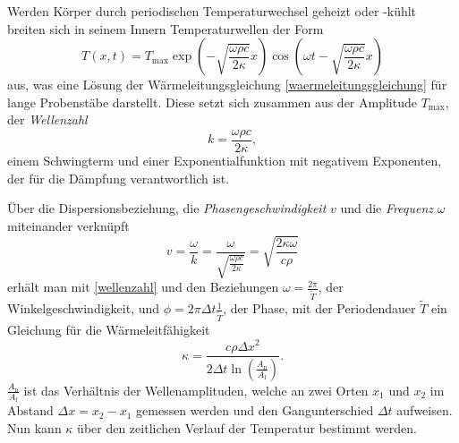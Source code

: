 Werden Körper durch periodischen Temperaturwechsel geheizt oder -kühlt breiten sich in seinem Innern Temperaturwellen der Form
\begin{equation}
	\label{temperaturwelle}
	T(x,t)= T_\mathup{max} \exp{\left(-\sqrt{\frac{\omega \rho c}{2\kappa}}x\right)} \cos{\left(\omega t - \sqrt{\frac{\omega \rho c}{2\kappa}}x\right)}
\end{equation}
aus, was eine Lösung der Wärmeleitungsgleichung \eqref{waermeleitungsgleichung} für lange Probenstäbe darstellt. Diese setzt sich zusammen aus der Amplitude $T_\text{max}$, der \emph{Wellenzahl} 
\begin{equation}
	\label{wellenzahl}
	k=\frac{\omega \rho c}{2\kappa} ,
\end{equation}
einem Schwingterm und einer Exponentialfunktion mit negativem Exponenten, der für die Dämpfung verantwortlich ist.

Über die Dispersionsbeziehung, die \emph{Phasengeschwindigkeit} $v$ und die \emph{Frequenz} $\omega$ miteinander verknüpft
\begin{equation}
	\label{dispersion}
	v=\frac{\omega}{k}=\frac{\omega}{\sqrt{\frac{\omega\rho c}{2\kappa}}}=\sqrt{\frac{2\kappa\omega}{c\rho}}
\end{equation}
erhält man mit \eqref{wellenzahl} und den Beziehungen $\omega=\frac{2\pi}{\tilde{T}}$, der Winkelgeschwindigkeit, und $\phi=2\pi\Delta{t}\frac{1}{\tilde{T}}$, der Phase, mit der Periodendauer $\tilde{T}$ ein Gleichung für die Wärmeleitfähigkeit
\begin{equation}
	\label{waermeleitfaehigkeit}
	\kappa=\frac{c\rho{\Delta{x}}^2}{2\Delta{t}\ln\left({\frac{A_\text{n}}{A_\text{f}}}\right)}.
\end{equation}
$\frac{A_\text{n}}{A_\text{f}}$ ist das Verhältnis der Wellenamplituden, welche an zwei Orten $x_1$ und $x_2$ im Abstand
$\Delta{x}=x_2-x_1$ gemessen werden und den Gangunterschied $\Delta{t}$ aufweisen. Nun kann $\kappa$ über den zeitlichen Verlauf der Temperatur bestimmt werden.

